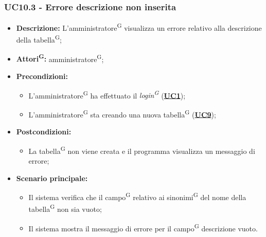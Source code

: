 \subsubsection{UC10.3 - Errore descrizione non inserita}
\label{sec:UC10.3}
\begin{itemize}
	\item \textbf{Descrizione:} L’amministratore\textsuperscript{G} visualizza un errore relativo alla descrizione della tabella\textsuperscript{G};
	\item \textbf{Attori\textsuperscript{G}:} amministratore\textsuperscript{G};
	\item \textbf{Precondizioni:} 
	\begin{itemize}
		\item L’amministratore\textsuperscript{G} ha effettuato il \textit{login\textsuperscript{G}} (\hyperref[sec:UC1]{\textbf{UC1}});
		\item L’amministratore\textsuperscript{G} sta creando una nuova tabella\textsuperscript{G} (\hyperref[sec:UC9]{\textbf{UC9}});
	\end{itemize}
	\item \textbf{Postcondizioni:} 
	\begin{itemize}
		\item La tabella\textsuperscript{G} non viene creata e il programma visualizza un messaggio di errore;
	\end{itemize}
	\item \textbf{Scenario principale:} 
	\begin{itemize}
		\item Il sistema verifica che il campo\textsuperscript{G} relativo ai sinonimi\textsuperscript{G} del nome della tabella\textsuperscript{G} non sia vuoto;
		\item Il sistema mostra il messaggio di errore per il campo\textsuperscript{G} descrizione vuoto.
	\end{itemize}
\end{itemize}

